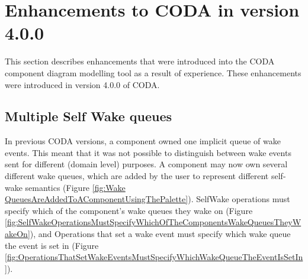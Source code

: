 \section{Enhancements to CODA in version 4.0.0}
\label{sec:component_diagrams-enhancements}
This section describes enhancements that were introduced into the CODA component diagram modelling tool as a result of experience. These enhancements were introduced in version 4.0.0 of CODA.

\subsection{Multiple Self Wake queues}
In previous CODA versions, a component owned one implicit queue of wake events. This meant that it was not possible to distinguish between wake events sent for different (domain level) purposes. A component may now own several different wake queues, which are added by the user to represent different self-wake semantics (Figure \ref{fig:Wake QueuesAreAddedToAComponentUsingThePalette}). SelfWake operations must specify which of the component's wake queues they wake on (Figure \ref{fig:SelfWakeOperationsMustSpecifyWhichOfTheComponentsWakeQueuesTheyWakeOn}), and Operations that set a wake event must specify which wake queue the event is set in (Figure \ref{fig:OperationsThatSetWakeEventsMustSpecifyWhichWakeQueueTheEventIsSetIn}). 

